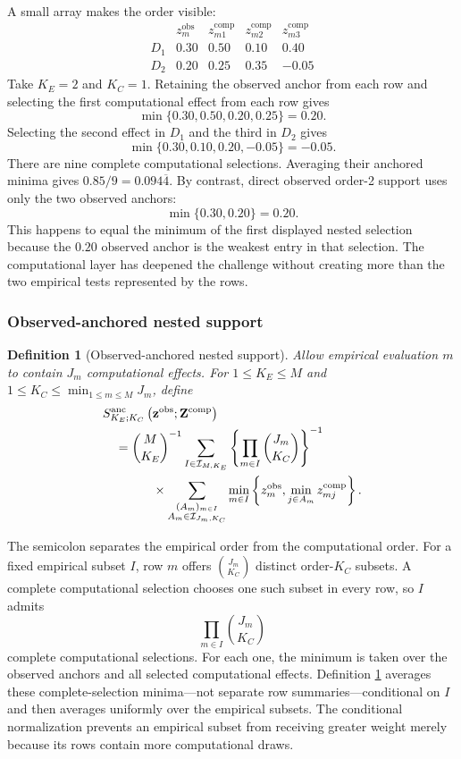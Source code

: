 \documentclass[11pt]{article}
\newcommand{\Sanc}{S^{\mathrm{anc}}}
\newtheorem{definition}{Definition}
\theoremstyle{remark}
\begin{document}
A small array makes the order visible:
\[
\begin{array}{c|c|ccc}
&z_m^{\mathrm{obs}}&z_{m1}^{\mathrm{comp}}&z_{m2}^{\mathrm{comp}}&z_{m3}^{\mathrm{comp}}\\
\hline
D_1&0.30&0.50&0.10&0.40\\
D_2&0.20&0.25&0.35&-0.05
\end{array}
\]
Take $K_E=2$ and $K_C=1$. Retaining the observed anchor from each row and
selecting the first computational effect from each row gives
\[
\min\{0.30,0.50,0.20,0.25\}=0.20.
\]
Selecting the second effect in $D_1$ and the third in $D_2$ gives
\[
\min\{0.30,0.10,0.20,-0.05\}=-0.05.
\]
There are nine complete computational selections. Averaging their anchored
minima gives $0.85/9=0.094\overline4$. By contrast, direct observed order-2
support uses only the two observed anchors:
\[
\min\{0.30,0.20\}=0.20.
\]
This happens to equal the minimum of the first displayed nested selection
because the $0.20$ observed anchor is the weakest entry in that selection. The
computational layer has deepened the challenge without creating more than the
two empirical tests represented by the rows.

\subsubsection{Observed-anchored nested support}

\begin{definition}[Observed-anchored nested support]
\label{def:anchored-support}
Allow empirical evaluation $m$ to contain $J_m$ computational effects. For
$1\leq K_E\leq M$ and
$1\leq K_C\leq\min_{1\leq m\leq M}J_m$, define
\begin{align}
&\Sanc_{K_E;K_C}
\left(\mathbf z^{\mathrm{obs}};\mathbf Z^{\mathrm{comp}}\right)
\notag\\
&\quad=
\binom{M}{K_E}^{-1}
\sum_{I\in\mathcal I_{M,K_E}}
\left\{
\prod_{m\in I}\binom{J_m}{K_C}
\right\}^{-1}
\notag\\
&\qquad\qquad\times
\sum_{\substack{
(A_m)_{m\in I}\\
A_m\in\mathcal I_{J_m,K_C}}}
\min_{m\in I}
\left\{
z_m^{\mathrm{obs}},
\min_{j\in A_m}z_{mj}^{\mathrm{comp}}
\right\}.
\label{eq:anchored-support}
\end{align}
\end{definition}

The semicolon separates the empirical order from the computational order. For
a fixed empirical subset $I$, row $m$ offers $\binom{J_m}{K_C}$ distinct
order-$K_C$ subsets. A complete computational selection chooses one such
subset in every row, so $I$ admits
\[
\prod_{m\in I}\binom{J_m}{K_C}
\]
complete computational selections. For each one, the minimum is taken over
the observed anchors and all selected computational effects. Definition
\ref{def:anchored-support} averages these complete-selection minima---not
separate row summaries---conditional on $I$ and then averages uniformly over
the empirical subsets. The conditional normalization prevents an empirical
subset from receiving greater weight merely because its rows contain more
computational draws.
\end{document}

